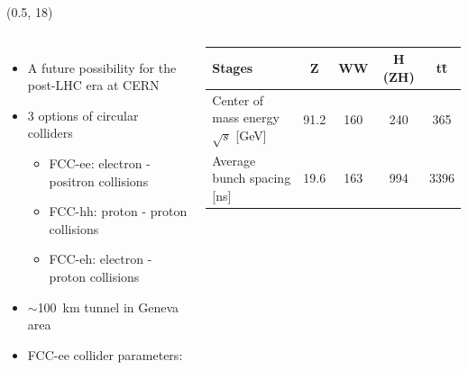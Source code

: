 \documentclass[final,xcolor={dvipsnames,svgnames,x11names,table}]{beamer}
\begin{document}
\begin{frame}
\begin{textblock}{44.5}(0.5, 18)
  \begin{tcolorbox}[title=The Future Circular Collider Experiment (FCC)]

  \begin{columns}
      \begin{itemize}
        \item A future possibility for the post-LHC era at CERN \vspace{0.2cm}
        \item 3 options of circular colliders \vspace{0.2cm}
          \begin{itemize}
            \item FCC-ee: electron - positron collisions
            \item FCC-hh: proton - proton collisions
            \item FCC-eh: electron - proton collisions
          \end{itemize}
        \item $\sim$100~km tunnel in Geneva area \vspace{0.2cm}
        \item FCC-ee collider parameters: \vspace{0.2cm}
      \end{itemize}
        \centering
      	\begin{tabular}{| l | c | c | c | c |}
        	\toprule
      	   Stages & Z & WW & H (ZH) & t\={t} \\
      	   \midrule
           Center of mass energy $\sqrt{s}$ [GeV] & 91.2 & 160 & 240 & 365 \\
           Average bunch spacing [ns] & 19.6 & 163 & 994 & 3396\\
      	   \bottomrule
      	\end{tabular}


\end{columns}
\end{tcolorbox}
\end{textblock}
\end{frame}
\end{document}

